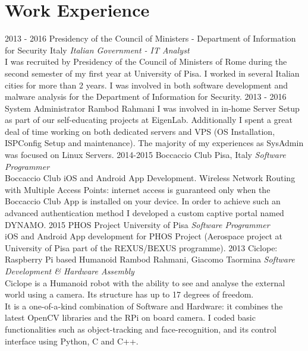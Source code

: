 \documentclass[]{friggeri-cv} %
\begin{document}
\section{Work Experience}
\vspace{-3mm}
\begin{entrylist}
\entry
{2013 - 2016}
{Presidency of the Council of Ministers - Department of Information for Security}
{Italy}
{\emph{Italian Government - IT Analyst} \\
I was recruited by Presidency of the Council of Ministers of Rome during the second semester of my first year at University of Pisa. I worked in several Italian cities for more than 2 years. I was involved in both software development and malware analysis for the  Department of Information for Security.}
\entry
{2013 - 2016}
{System Administrator}
{Rambod Rahmani}
{I was involved in in-home Server Setup as part of our self-educating projects at EigenLab. Additionally I spent a great deal of time working on both dedicated servers and VPS (OS Installation, ISPConfig Setup and maintenance). The majority of my experiences as SysAdmin was focused on Linux Servers.}
\entry
{2014-2015}
{Boccaccio Club}
{Pisa, Italy}
{\emph{Software Programmer} \\
Boccaccio Club iOS and Android App Development. Wireless Network Routing with Multiple Access Points: internet access is guaranteed only when the Boccaccio Club App is installed on your device. In order to achieve such an advanced authentication method I developed a custom captive portal named DYNAMO.}
\entry
{2015}
{PHOS Project}
{University of Pisa}
{\emph{Software Programmer} \\
iOS and Android App development for PHOS Project (Aerospace project at University of Pisa part of the REXUS/BEXUS programme).}
\entry
{2013}
{Ciclope: Raspberry Pi based Humanoid}
{Rambod Rahmani, Giacomo Taormina}
{\emph{Software Development \& Hardware Assembly} \\
Ciclope is a Humanoid robot with the ability to see and analyse the external world using a camera. Its structure has up to 17 degrees of freedom.\\
It is a one-of-a-kind combination of Software and Hardware: it combines the latest OpenCV libraries and the RPi on board camera. I coded basic functionalities such as object-tracking and face-recognition, and its control interface using Python, C and C++.}

\end{entrylist}
\end{document}
